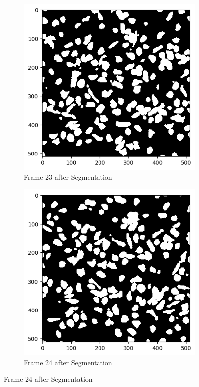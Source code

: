 \documentclass{article}
\begin{document}
\begin{figure}[h!]
  \begin{subfigure}{0.4\textwidth}
    \includegraphics[width=\linewidth]{Report/Appendix_Images/Segmentation-B-Growth/frame_23.png}
    \caption*{Frame 23 after Segmentation}
  \end{subfigure}
  \hfill
  \begin{subfigure}{0.4\textwidth}
    \includegraphics[width=\linewidth]{Report/Appendix_Images/Segmentation-B-Growth/frame_24.png}
    \caption*{Frame 24 after Segmentation}
  \end{subfigure}
\end{figure}
\end{document}
